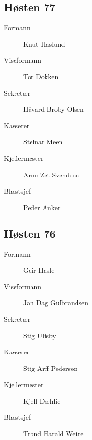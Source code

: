 {\begin{minipage}{0.6\textwidth}
\begin{description}
\end{description}
\subsection*{Høsten 77}

\begin{description}
	\item[Formann]  Knut Haslund
	\item[Viseformann] Tor Dokken
	\item[Sekretær] Håvard Broby Olsen
	\item[Kasserer] Steinar Meen
	\item[Kjellermester] Arne Zet Svendsen
	\item[Blæstsjef] Peder Anker
\end{description}
\subsection*{Høsten 76}

\begin{description}
	\item[Formann]  Geir Hasle
	\item[Viseformann] Jan Dag Gulbrandsen
	\item[Sekretær] Stig Ulfsby
	\item[Kasserer] Stig Arff Pedersen
	\item[Kjellermester] Kjell Dæhlie
	\item[Blæstsjef] Trond Harald Wetre
\end{description}
\end{minipage}
}



